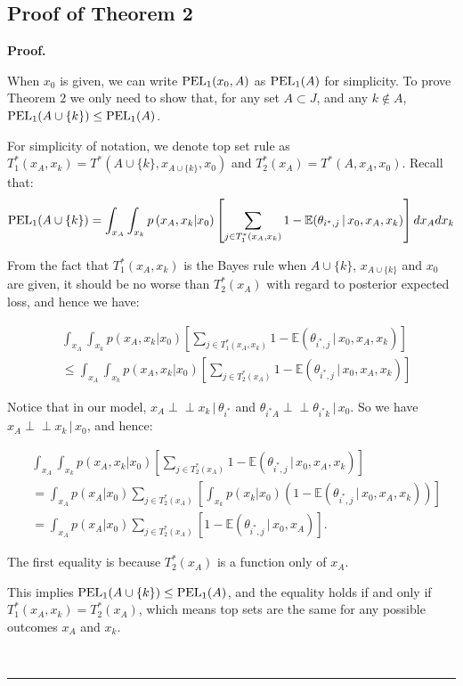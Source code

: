\documentclass[12pt]{article}
\newenvironment{proof}[1][Proof]{\noindent\textbf{#1.} }{\ \rule{0.5em}{0.5em}}
\newcommand{\indep}{\perp \!\!\! \perp}
\begin{document}
\subsection{Proof of Theorem 2}
\begin{proof}

When $x_0$ is given, we can write ${\mbox {\rm PEL}}_1(x_0,A)$ as ${\mbox {\rm PEL}}_1(A)$ for simplicity. To prove Theorem $2$ we only need to show that, for any set $A \subset J$, and any $k\notin A$, ${\mbox {\rm PEL}}_1(A\cup\{k\})\leq {\mbox {\rm PEL}}_1(A)$.

For simplicity of notation, we denote top set rule as 
$T_1^*(x_A,x_k) = T^*(A\cup\{k\}, x_{A\cup\{k\}}, x_0)$ and $T_2^*(x_A) = T^*(A, x_{A}, x_0)$. Recall that:
\begin{eqnarray*}
    {\mbox {\rm PEL}}_1(A\cup\{k\})= \int_{x_{A}}\int_{x_k} p\left( x_{A},x_k | x_0 \right) 
\left[ \sum_{j \in  T_1^*(x_A,x_k)}  1 - \mathbb{E} (\theta_{i^*,j} \, |\, x_0,x_A,x_k) \right]dx_A dx_k
\end{eqnarray*}

From the fact that $T_1^*(x_A,x_k)$ is the Bayes rule when $A\cup\{k\}$, $x_{A\cup\{k\}}$ and $x_0$ are given, it should be no worse than $T_2^*(x_A)$ with regard to posterior expected loss, and hence we have:

\begin{align*}
&\int_{x_{A}}\int_{x_k} p\left( x_{A},x_k | x_0 \right)
\left[ \sum_{j \in  T_1^*(x_A,x_k)}  1 - \mathbb{E} (\theta_{i^*,j} \, |\, x_0,x_A,x_k) \right]\\ 
&\leq 
\int_{x_{A}}\int_{x_k} p\left( x_{A},x_k | x_0 \right)
\left[ \sum_{j \in  T_2^*(x_A)}  1 - \mathbb{E} (\theta_{i^*,j} \, |\, x_0,x_A,x_k) \right]
\end{align*}

Notice that in our model, $x_A \indep x_k \, | \, \theta_{i^*}$ and $\theta_{i^*A}\indep \theta_{i^*k}\, | \, x_0$. So we have $x_A\indep x_k\,|\, x_0$, and hence:

\begin{align*}
&\int_{x_{A}}\int_{x_k} p\left( x_{A},x_k | x_0 \right)
\left[ \sum_{j \in  T_2^*(x_A)}  1 - \mathbb{E} (\theta_{i^*,j} \, |\, x_0,x_A,x_k) \right]\\
    &= \int_{x_{A}}p\left(x_A|x_0\right)\sum_{j \in  T_2^*(x_A)}\left[\int_{x_k}p(x_k|x_0)\left(1-\mathbb{E} (\theta_{i^*,j} \, |\, x_0,x_A,x_k)\right)\right]\\
&= \int_{x_{A}}p\left(x_A|x_0\right) \sum_{j \in  T_2^*(x_A)}\left[  1 - \mathbb{E} (\theta_{i^*,j} \, |\, x_0,x_A) \right].
\end{align*}


The first equality is because $T_2^*(x_A)$ is a function only of $x_A$. 

This implies ${\mbox {\rm PEL}}_1(A\cup\{k\})\leq {\mbox {\rm PEL}}_1(A)$, and the equality holds if and only if $T_1^*(x_A,x_k) = T_2^*(x_A)$, which means top sets are the same for any possible outcomes $x_A$ and $x_k$. 

\end{proof}
\end{document}
